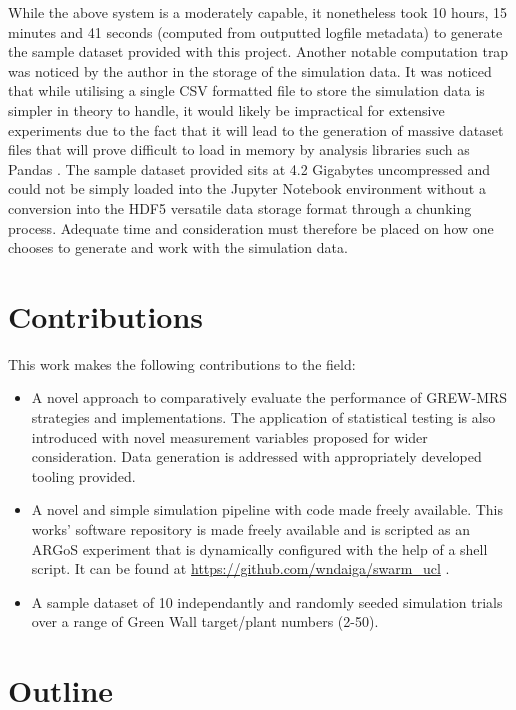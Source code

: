 \documentclass{report}
\begin{document}
While the above system is a moderately capable, it nonetheless took 10 hours, 15 minutes and 41 seconds (computed from outputted logfile metadata) to generate the sample dataset provided with this project. Another notable computation trap was noticed by the author in the storage of the simulation data. It was noticed that while utilising a single CSV formatted file to store the simulation data is simpler in theory to handle, it would likely be impractical for extensive experiments due to the fact that it will lead to the generation of massive dataset files that will prove difficult to load in memory by analysis libraries such as Pandas \cite{Pandas}. The sample dataset provided sits at 4.2 Gigabytes uncompressed and could not be simply loaded into the Jupyter Notebook \cite{Jupyter} environment without a conversion into the HDF5 \cite{HDF5} versatile data storage format through a chunking process. Adequate time and consideration must therefore be placed on how one chooses to generate and work with the simulation data.

\section{Contributions}
This work makes the following contributions to the field:

\begin{itemize}
	\item A novel approach to comparatively evaluate the performance of GREW-MRS strategies and implementations. The application of statistical testing is also introduced with novel measurement variables proposed for wider consideration. Data generation is addressed with appropriately developed tooling provided.
	\item A novel and simple simulation pipeline with code made freely available. This works' software repository is made freely available and is scripted as an ARGoS experiment that is dynamically configured with the help of a shell script. It can be found at \url{https://github.com/wndaiga/swarm_ucl} \cite{SWARMCODE}.
	\item A sample dataset of 10 independantly and randomly seeded simulation trials over a range of Green Wall target/plant numbers (2-50).
\end{itemize}

\section{Outline}
\end{document}
